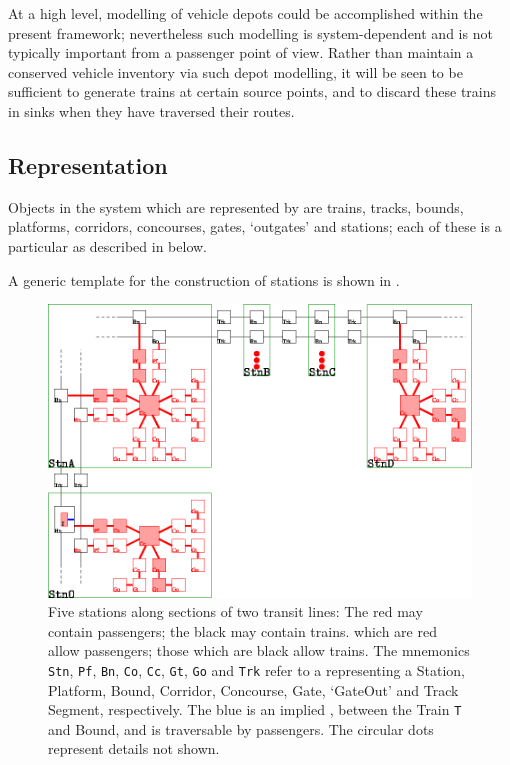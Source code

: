 At a high level, modelling of vehicle depots could be accomplished
within the present framework; nevertheless such modelling is
system-dependent and is not typically important from a passenger point
of view. Rather than maintain a conserved vehicle inventory via such
depot modelling, it will be seen to be sufficient to generate trains
at certain source points, and to discard these trains in sinks when
they have traversed their routes.

\subsection{Representation}
\label{sec:repr}

Objects in the system which are represented by  are
trains, tracks, bounds, platforms, corridors, concourses, gates, `outgates'
and stations; each of these is a particular  as described in  below.

A generic template for the construction of stations is shown in .
\begin{figure}[ht]
  \centering
  \includegraphics[angle=0,width=12cm]{60_figs/_SeveralStations2.eps}
  \caption{
    Five stations along sections of two transit lines:
    The red  may contain passengers; the black may contain trains.
     which are red allow passengers; those which are black allow trains.
    The mnemonics {\tt Stn}, {\tt Pf}, {\tt Bn}, {\tt Co}, {\tt Cc}, {\tt Gt}, {\tt Go} and {\tt Trk} refer to a 
    representing a Station, Platform, Bound, Corridor, Concourse, Gate, `GateOut' and Track Segment, respectively.
    The blue  is an implied , between the Train {\tt T} and Bound, and is traversable by passengers.
    The circular dots represent details not shown.
    \label{fig:STN}
  }
\end{figure}

